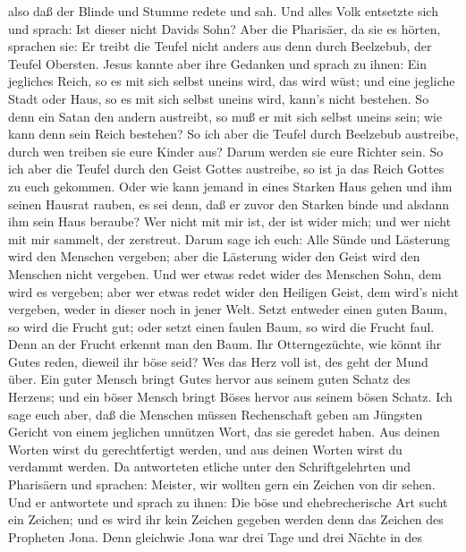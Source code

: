 also daß der Blinde und Stumme redete und sah.  Und alles
Volk entsetzte sich und sprach: Ist dieser nicht Davids Sohn?
 Aber die Pharisäer, da sie es hörten, sprachen sie: Er
treibt die Teufel nicht anders aus denn durch Beelzebub, der Teufel
Obersten.  Jesus kannte aber ihre Gedanken und sprach zu
ihnen: Ein jegliches Reich, so es mit sich selbst uneins wird, das wird
wüst; und eine jegliche Stadt oder Haus, so es mit sich selbst uneins
wird, kann's nicht bestehen.  So denn ein Satan den andern
austreibt, so muß er mit sich selbst uneins sein; wie kann denn sein
Reich bestehen?  So ich aber die Teufel durch Beelzebub
austreibe, durch wen treiben sie eure Kinder aus? Darum werden sie eure
Richter sein.  So ich aber die Teufel durch den Geist
Gottes austreibe, so ist ja das Reich Gottes zu euch gekommen.
 Oder wie kann jemand in eines Starken Haus gehen und ihm
seinen Hausrat rauben, es sei denn, daß er zuvor den Starken binde und
alsdann ihm sein Haus beraube?  Wer nicht mit mir ist, der
ist wider mich; und wer nicht mit mir sammelt, der zerstreut.
 Darum sage ich euch: Alle Sünde und Lästerung wird den
Menschen vergeben; aber die Lästerung wider den Geist wird den Menschen
nicht vergeben.  Und wer etwas redet wider des Menschen
Sohn, dem wird es vergeben; aber wer etwas redet wider den Heiligen
Geist, dem wird's nicht vergeben, weder in dieser noch in jener Welt.
 Setzt entweder einen guten Baum, so wird die Frucht gut;
oder setzt einen faulen Baum, so wird die Frucht faul. Denn an der
Frucht erkennt man den Baum.  Ihr Otterngezüchte, wie könnt
ihr Gutes reden, dieweil ihr böse seid? Wes das Herz voll ist, des geht
der Mund über.  Ein guter Mensch bringt Gutes hervor aus
seinem guten Schatz des Herzens; und ein böser Mensch bringt Böses
hervor aus seinem bösen Schatz.  Ich sage euch aber, daß
die Menschen müssen Rechenschaft geben am Jüngsten Gericht von einem
jeglichen unnützen Wort, das sie geredet haben.  Aus deinen
Worten wirst du gerechtfertigt werden, und aus deinen Worten wirst du
verdammt werden.  Da antworteten etliche unter den
Schriftgelehrten und Pharisäern und sprachen: Meister, wir wollten gern
ein Zeichen von dir sehen.  Und er antwortete und sprach zu
ihnen: Die böse und ehebrecherische Art sucht ein Zeichen; und es wird
ihr kein Zeichen gegeben werden denn das Zeichen des Propheten Jona.
 Denn gleichwie Jona war drei Tage und drei Nächte in des
